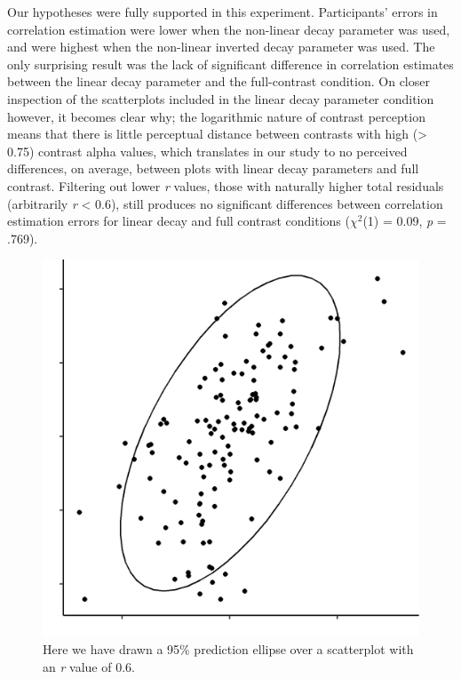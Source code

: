 \documentclass[preprint, 3p,
authoryear]{elsarticle} %
\begin{document}
Our hypotheses were fully supported in this experiment. Participants'
errors in correlation estimation were lower when the non-linear decay
parameter was used, and were highest when the non-linear inverted decay
parameter was used. The only surprising result was the lack of
significant difference in correlation estimates between the linear decay
parameter and the full-contrast condition. On closer inspection of the
scatterplots included in the linear decay parameter condition however,
it becomes clear why; the logarithmic nature of contrast perception
\citep{varshney_2013, fechner_1948} means that there is little
perceptual distance between contrasts with high (\textgreater{} 0.75)
contrast alpha values, which translates in our study to no perceived
differences, on average, between plots with linear decay parameters and
full contrast. Filtering out lower \emph{r} values, those with naturally
higher total residuals (arbitrarily \emph{r} \textless{} 0.6), still
produces no significant differences between correlation estimation
errors for linear decay and full contrast conditions (\(\chi^2\)(1) =
0.09, \emph{p} = .769).

\begin{figure}

\includegraphics[width=0.5\linewidth]{images/prediction_ellipse} \hfill{}

\caption{\label{prediction-ellipse}Here we have drawn a 95\% prediction ellipse over a scatterplot with an \textit{r} value of 0.6.}\label{fig:prediction-ellipse}
\end{figure}
\end{document}
